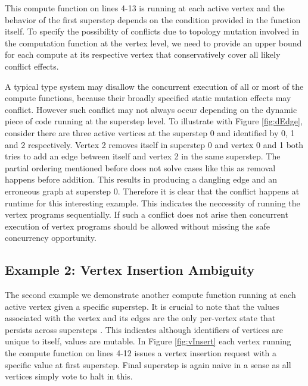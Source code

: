 This compute function on lines 4-13 is running at each active vertex and the behavior of the first superstep depends on the condition provided in the function itself. To specify the possibility of conflicts due to topology mutation involved in the computation function at the vertex level, we need to provide an upper bound for each compute at its respective vertex that conservatively cover all likely conflict effects.

A typical type system may disallow the concurrent execution of all or most of the compute functions, because their broadly specified static mutation effects may conflict. However such conflict may not always occur depending on the dynamic piece of code running at the superstep level. To illustrate with Figure \ref{fig:dEdge}, consider there are three active vertices at the superstep 0 and identified by 0, 1 and 2 respectively. Vertex 2 removes itself in superstep 0 and vertex 0 and 1 both tries to add an edge between itself and vertex 2 in the same superstep. The partial ordering mentioned before does not solve cases like this as removal happens before addition. This results in producing a dangling edge and an erroneous graph at superstep 0. Therefore it is clear that the conflict happens at runtime for this interesting example. This indicates the neccessity of running the vertex programs sequentially. If such a conflict does not arise then concurrent execution of vertex programs should be allowed without missing the safe concurrency opportunity. 



\subsection{Example 2: Vertex Insertion Ambiguity}
\label{subsec:example2}

The second example we demonstrate another compute function running at each active vertex given a specific superstep. It is crucial to note that the values associated with the vertex and its edges are the only per-vertex state that persists across supersteps \cite{Pregel2010}. This indicates although identifiers of vertices are unique to itself, values are mutable. In Figure \ref{fig:vInsert} each vertex running the compute function on lines 4-12 issues a vertex insertion request with a specific value at first superstep. Final superstep is again naive in a sense as all vertices simply vote to halt in this.


